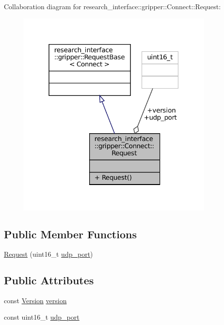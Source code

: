 Collaboration diagram for research\+\_\+interface\+:\+:gripper\+:\+:Connect\+:\+:Request\+:
\nopagebreak
\begin{figure}[H]
\begin{center}
\leavevmode
\includegraphics[width=280pt]{structresearch__interface_1_1gripper_1_1Connect_1_1Request__coll__graph}
\end{center}
\end{figure}
\subsection*{Public Member Functions}
\begin{DoxyCompactItemize}
\item 
\hyperlink{structresearch__interface_1_1gripper_1_1Connect_1_1Request_a219484f2951e25447f666e97e5b091c8}{Request} (uint16\+\_\+t \hyperlink{structresearch__interface_1_1gripper_1_1Connect_1_1Request_ad1a7eba96bd79414bb2aef4c202116fc}{udp\+\_\+port})
\end{DoxyCompactItemize}
\subsection*{Public Attributes}
\begin{DoxyCompactItemize}
\item 
const \hyperlink{namespaceresearch__interface_1_1gripper_a76ede520b2fa3582ac95cd919eceef5b}{Version} \hyperlink{structresearch__interface_1_1gripper_1_1Connect_1_1Request_a6caad7ccadefdc3068368e1e466a86c7}{version}
\item 
const uint16\+\_\+t \hyperlink{structresearch__interface_1_1gripper_1_1Connect_1_1Request_ad1a7eba96bd79414bb2aef4c202116fc}{udp\+\_\+port}
\end{DoxyCompactItemize}


